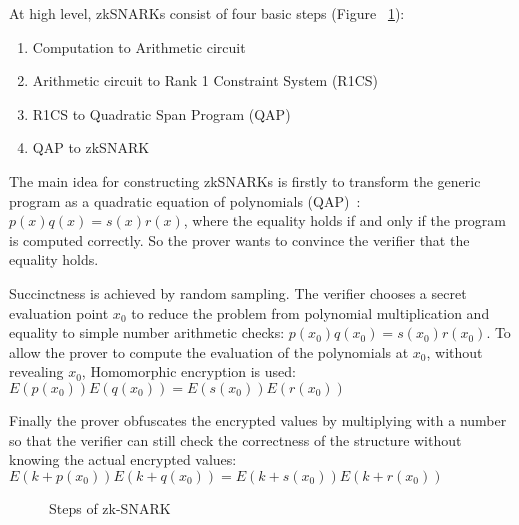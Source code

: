 At high level, zkSNARKs consist of four basic steps (Figure ~\ref{fig:zkp:zksnark_flow}):

\begin{enumerate}
  \item Computation to Arithmetic circuit~\cite{pinocchio-nearly-practical-verifiable-computation}
  \item Arithmetic circuit to Rank 1 Constraint System (R1CS)~\cite{ggpr}
  \item R1CS to Quadratic Span Program (QAP)~\cite{ggpr}
  \item QAP to zkSNARK~\cite{pinocchio-nearly-practical-verifiable-computation}
\end{enumerate}

The main idea for constructing zkSNARKs is firstly to transform the generic program as a quadratic equation of polynomials (QAP)~\cite{ggpr}: $p(x)q(x) = s(x)r(x)$, where the equality holds if and only if the program is computed correctly. So the prover wants to convince the verifier that the equality holds.

Succinctness is achieved by random sampling. The verifier chooses a secret evaluation point $x_0$ to reduce the problem from polynomial multiplication and equality to simple number arithmetic checks: $p(x_0)q(x_0) = s(x_0)r(x_0)$. To allow the prover to compute the evaluation of the polynomials at $x_0$, without revealing $x_0$, Homomorphic encryption is used:  $E(p(x_0))E(q(x_0)) = E(s(x_0))E(r(x_0))$

Finally the prover obfuscates the encrypted values by multiplying with a number so that the verifier can still check the correctness of the structure without knowing the actual
encrypted values: $E(k + p(x_0))E(k + q(x_0)) = E(k + s(x_0))E(k + r(x_0))$

\begin{figure}[ht!]
  \caption{Steps of zk-SNARK}
  \label{fig:zkp:zksnark_flow}
\end{figure}

